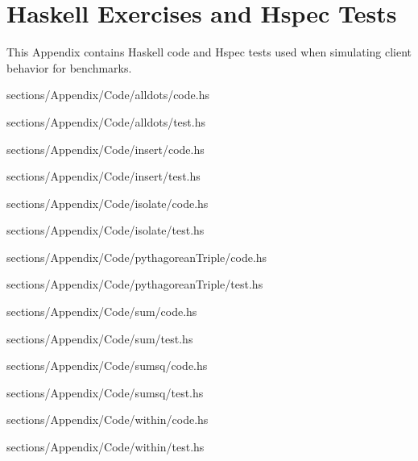 \chapter{Haskell Exercises and Hspec Tests} \label{chap:TestCode}
This Appendix contains Haskell code and Hspec tests used when simulating client behavior for benchmarks.



{sections/Appendix/Code/alldots/code.hs}

{sections/Appendix/Code/alldots/test.hs}


{sections/Appendix/Code/insert/code.hs}

{sections/Appendix/Code/insert/test.hs}


{sections/Appendix/Code/isolate/code.hs}

{sections/Appendix/Code/isolate/test.hs}


{sections/Appendix/Code/pythagoreanTriple/code.hs}

{sections/Appendix/Code/pythagoreanTriple/test.hs}


{sections/Appendix/Code/sum/code.hs}

{sections/Appendix/Code/sum/test.hs}


{sections/Appendix/Code/sumsq/code.hs}

{sections/Appendix/Code/sumsq/test.hs}


{sections/Appendix/Code/within/code.hs}

{sections/Appendix/Code/within/test.hs}
